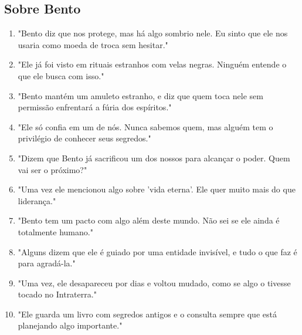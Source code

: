 \subsection*{Sobre Bento}
\begin{enumerate}
    \item "Bento diz que nos protege, mas há algo sombrio nele. Eu sinto que ele nos usaria como moeda de troca sem hesitar."
    \item "Ele já foi visto em rituais estranhos com velas negras. Ninguém entende o que ele busca com isso."
    \item "Bento mantém um amuleto estranho, e diz que quem toca nele sem permissão enfrentará a fúria dos espíritos."
    \item "Ele só confia em um de nós. Nunca sabemos quem, mas alguém tem o privilégio de conhecer seus segredos."
    \item "Dizem que Bento já sacrificou um dos nossos para alcançar o poder. Quem vai ser o próximo?"
    \item "Uma vez ele mencionou algo sobre 'vida eterna'. Ele quer muito mais do que liderança."
    \item "Bento tem um pacto com algo além deste mundo. Não sei se ele ainda é totalmente humano."
    \item "Alguns dizem que ele é guiado por uma entidade invisível, e tudo o que faz é para agradá-la."
    \item "Uma vez, ele desapareceu por dias e voltou mudado, como se algo o tivesse tocado no Intraterra."
    \item "Ele guarda um livro com segredos antigos e o consulta sempre que está planejando algo importante."
\end{enumerate}

